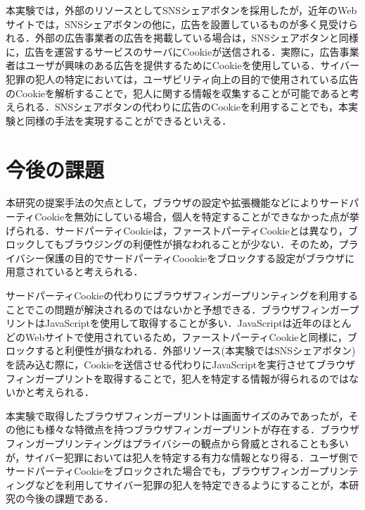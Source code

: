 \documentclass[10pt, a4paper]{jreport}
\begin{document}
本実験では，外部のリソースとしてSNSシェアボタンを採用したが，近年のWebサイトでは，SNSシェアボタンの他に，広告を設置しているものが多く見受けられる．外部の広告事業者の広告を掲載している場合は，SNSシェアボタンと同様に，広告を運営するサービスのサーバにCookieが送信される．実際に，広告事業者はユーザが興味のある広告を提供するためにCookieを使用している\cite{third_party_cookie_is_danger}．サイバー犯罪の犯人の特定においては，ユーザビリティ向上の目的で使用されている広告のCookieを解析することで，犯人に関する情報を収集することが可能であると考えられる．SNSシェアボタンの代わりに広告のCookieを利用することでも，本実験と同様の手法を実現することができるといえる．

\section{今後の課題}
本研究の提案手法の欠点として，ブラウザの設定や拡張機能などによりサードパーティCookieを無効にしている場合，個人を特定することができなかった点が挙げられる．サードパーティCookieは，ファーストパーティCookieとは異なり，ブロックしてもブラウジングの利便性が損なわれることが少ない．そのため，プライバシー保護の目的でサードパーティCoookieをブロックする設定がブラウザに用意されていると考えられる．

サードパーティCookieの代わりにブラウザフィンガープリンティングを利用することでこの問題が解決されるのではないかと予想できる．ブラウザフィンガープリントはJavaScriptを使用して取得することが多い．JavaScriptは近年のほとんどのWebサイトで使用されているため，ファーストパーティCookieと同様に，ブロックすると利便性が損なわれる．外部リソース(本実験ではSNSシェアボタン)を読み込む際に，Cookieを送信させる代わりにJavaScriptを実行させてブラウザフィンガープリントを取得することで，犯人を特定する情報が得られるのではないかと考えられる．

本実験で取得したブラウザフィンガープリントは画面サイズのみであったが，その他にも様々な特徴点を持つブラウザフィンガープリントが存在する\cite{kind_of_fingerprints}\cite{canvas_fingerprinting}．ブラウザフィンガープリンティングはプライバシーの観点から脅威とされることも多いが，サイバー犯罪においては犯人を特定する有力な情報となり得る．ユーザ側でサードパーティCookieをブロックされた場合でも，ブラウザフィンガープリンティングなどを利用してサイバー犯罪の犯人を特定できるようにすることが，本研究の今後の課題である．
\end{document}
